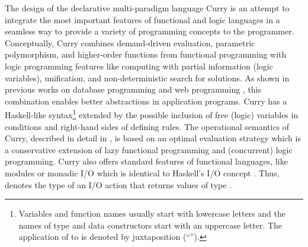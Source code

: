 \documentclass{tlp}
\begin{document}
The design of the declarative multi-paradigm language Curry
is an attempt to integrate the most important features
of functional and logic languages in a seamless way
to provide a variety of programming concepts to the programmer.
Conceptually, Curry combines demand-driven evaluation,
parametric polymorphism, and
higher-order functions from functional programming
with logic programming features like
computing with partial information (logic variables),
unification, and non-deterministic search for solutions.
As shown in previous works on database programming
\cite{BrasselHanusMueller08PADL,Fischer05}
and web programming \cite{Hanus01PADL,Hanus06PPDP,Hanus07PPDP},
this combination enables better abstractions in application programs.
Curry has a Haskell-like syntax\footnote{Variables and function names usually
start with lowercase letters and the names of type and data constructors
start with an uppercase letter. The application of 
to  is denoted by juxtaposition (``'').}
\cite{PeytonJones03Haskell}
extended by the possible inclusion of free (logic)
variables in conditions and right-hand sides of defining rules.
The operational semantics of Curry, described in detail in
\cite{Hanus97POPL,Hanus12Curry}, is based on an optimal evaluation strategy
\cite{AntoyEchahedHanus00JACM} which is a conservative extension
of lazy functional programming and (concurrent) logic programming.
Curry also offers standard features of
functional languages, like modules or monadic I/O
which is identical to Haskell's I/O concept \cite{Wadler97}.
Thus,  denotes the type of an I/O action that returns values
of type .
\end{document}
